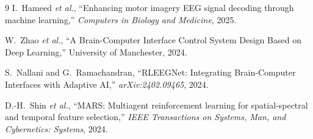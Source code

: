 \documentclass[twocolumn]{article}
\begin{document}
\begin{thebibliography}{9}
I.~Hameed \emph{et al.}, ``Enhancing motor imagery EEG signal decoding through machine learning,'' \textit{Computers in Biology and Medicine}, 2025.

W.~Zhao \emph{et al.}, ``A Brain-Computer Interface Control System Design Based on Deep Learning,'' University of Manchester, 2024.

S.~Nallani and G.~Ramachandran, ``RLEEGNet: Integrating Brain-Computer Interfaces with Adaptive AI,'' \textit{arXiv:2402.09465}, 2024.

D.-H.~Shin \emph{et al.}, ``MARS: Multiagent reinforcement learning for spatial-spectral and temporal feature selection,'' \textit{IEEE Transactions on Systems, Man, and Cybernetics: Systems}, 2024.
\end{thebibliography}
\end{document}

